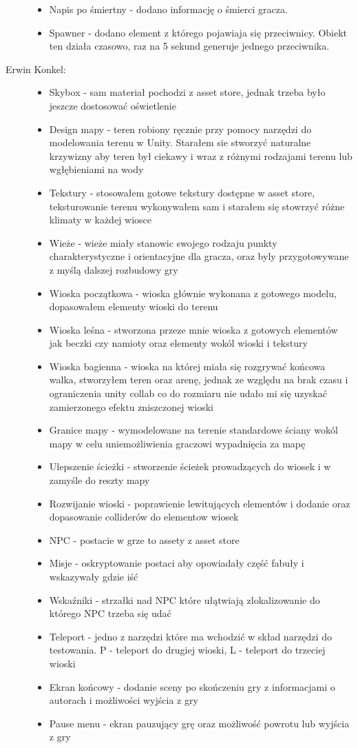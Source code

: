 \documentclass[10pt,a4paper]{article}
\begin{document}
\begin{description}
\begin{itemize}
	  \item Napis po śmiertny - dodano informację o śmierci gracza.
	  \item Spawner - dodano element z którego pojawiaja się przeciwnicy. Obiekt ten działa czasowo, raz na 5 sekund generuje jednego przeciwnika.
	\end{itemize}
  \item[ Erwin Konkel:] \hfill
  	\begin{itemize}
      \item Skybox - sam materiał pochodzi z asset store, jednak trzeba było jeszcze dostosować oświetlenie
  	  \item Design mapy - teren robiony ręcznie przy pomocy narzędzi do modelowania terenu w Unity. Starałem sie stworzyć naturalne krzywizny aby teren był 		   ciekawy i wraz z różnymi rodzajami terenu lub wgłębieniami na wody
 	  \item Tekstury - stosowałem gotowe tekstury dostępne w asset store, teksturowanie terenu wykonywałem sam i starałem się stowrzyć różne klimaty w 				   każdej wiosce
  	  \item Wieże - wieże miały stanowic swojego rodzaju punkty charakterystyczne i orientacyjne dla gracza, oraz byly przygotowywane z myślą dalszej 					  rozbudowy gry
	  \item Wioska początkowa - wioska głównie wykonana z gotowego modelu, dopasowałem elementy wioski do terenu
	  \item Wioska leśna - stworzona przeze mnie wioska z gotowych elementów jak beczki czy namioty oraz elementy wokól wioski i tekstury
	  \item Wioska bagienna - wioska na której miała się rozgrywać końcowa walka, stworzyłem teren oraz arenę, jednak ze względu na brak czasu i 					   ograniczenia unity collab co do rozmiaru nie udało mi się uzyskać zamierzonego efektu zniszczonej wioski
 	  \item Granice mapy - wymodelowane na terenie standardowe ściany wokól mapy w celu uniemożliwienia graczowi wypadnięcia za mapę
  	  \item Ulepszenie ścieżki - stworzenie ścieżek prowadzących do wiosek i w zamyśle do reszty mapy 
	  \item Rozwijanie wioski - poprawienie lewitujących elementów i dodanie oraz dopasowanie colliderów do elementow wiosek
	  \item NPC - postacie w grze to assety z asset store
	  \item Misje - oskryptowanie postaci aby opowiadały część fabuły i wskazywały gdzie iść
	  \item Wskaźniki - strzałki nad NPC które ułątwiają zlokalizowanie do którego NPC trzeba się udać
	  \item Teleport - jedno z narzędzi które ma wchodzić w skład narzędzi do testowania. P - teleport do drugiej wioski, L - teleport do trzeciej wioski
	  \item Ekran końcowy - dodanie sceny po skończeniu gry z informacjami o autorach i możliwości wyjścia z gry
	  \item Pause menu - ekran pauzujący grę oraz możliwość powrotu lub wyjścia z gry
	  

\end{itemize}
\end{description}
\end{document}
